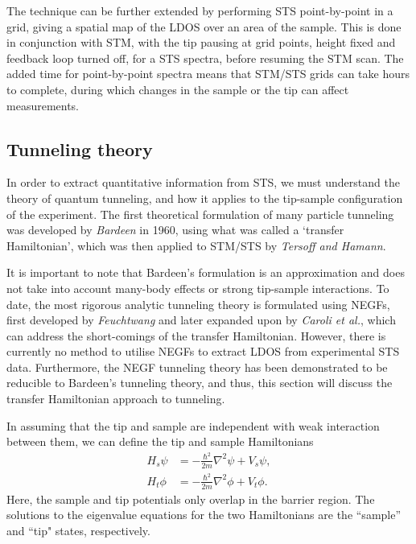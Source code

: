 \begin{figure} [h]
    \centering
    \caption{}
    \label{fig:2.2-stsldos}
\end{figure}

The technique can be further extended by performing \ac{STS} point-by-point in a grid, giving a spatial map of the \ac{LDOS} over an area of the sample. This is done in conjunction with \ac{STM}, with the tip pausing at grid points, height fixed and feedback loop turned off, for a \ac{STS} spectra, before resuming the \ac{STM} scan. The added time for point-by-point spectra means that \ac{STM}/\ac{STS} grids can take hours to complete, during which changes in the sample or the tip can affect measurements. 


\subsection{Tunneling theory}
In order to extract quantitative information from \ac{STS}, we must understand the theory of quantum tunneling, and how it applies to the tip-sample configuration of the experiment. The first theoretical formulation of many particle tunneling was developed by \textit{Bardeen} in 1960, using what was called a `transfer Hamiltonian', which was then applied to \ac{STM}/\ac{STS} by \textit{Tersoff and Hamann}. 

It is important to note that Bardeen's formulation is an approximation and does not take into account many-body effects or strong tip-sample interactions. To date, the most rigorous analytic tunneling theory is formulated using \acp{NEGF}, first developed by \textit{Feuchtwang} and later expanded upon by \textit{Caroli et al.}, which can address the short-comings of the transfer Hamiltonian. However, there is currently no method to utilise \acp{NEGF} to extract \ac{LDOS} from experimental \ac{STS} data. Furthermore, the \ac{NEGF} tunneling theory has been demonstrated to be reducible to Bardeen's tunneling theory, and thus, this section will discuss the transfer Hamiltonian approach to tunneling.

In assuming that the tip and sample are independent with weak interaction between them, we can define the tip and sample Hamiltonians
\begin{align}
H_{s}\psi &= -\frac{\hbar^2}{2m} \nabla^2 \psi + V_{s} \psi, \\
H_{t}\phi &= -\frac{\hbar^2}{2m} \nabla^2 \phi + V_{t} \phi .
\end{align}
Here, the sample and tip potentials only overlap in the barrier region. The solutions to the eigenvalue equations for the two Hamiltonians are the ``sample'' and ``tip" states, respectively. 


